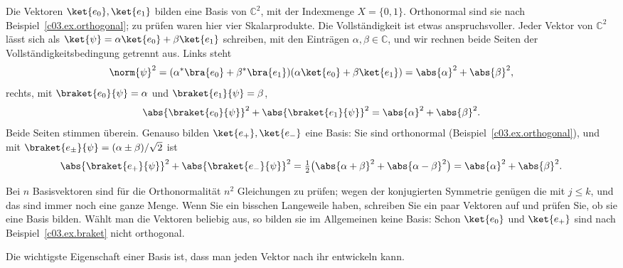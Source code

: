 \begin{example}\label{c03.ex.basis}
  Die Vektoren $\ket{e_0}, \ket{e_1}$ bilden eine Basis von $\mathbb{C}^2$, mit der Indexmenge
  $X = \{0, 1\}$. Orthonormal sind sie nach Beispiel~\ref{c03.ex.orthogonal}; zu prüfen waren
  hier vier Skalarprodukte. Die Vollständigkeit ist etwas anspruchsvoller. Jeder Vektor von
  $\mathbb{C}^2$ lässt sich als $\ket{\psi} = \alpha \ket{e_0} + \beta \ket{e_1}$ schreiben, mit
  den Einträgen $\alpha, \beta \in \mathbb{C}$, und wir rechnen beide Seiten der
  Vollständigkeitsbedingung getrennt aus. Links steht
  \begin{equation}\label{c03.eq.basis-links}
    \norm{\psi}^2 = (\alpha^* \bra{e_0} + \beta^* \bra{e_1}) (\alpha \ket{e_0} + \beta \ket{e_1})
    = \abs{\alpha}^2 + \abs{\beta}^2 ,
  \end{equation}
  rechts, mit $\braket{e_0}{\psi} = \alpha$ und $\braket{e_1}{\psi} = \beta$,
  \begin{equation}\label{c03.eq.basis-rechts}
    \abs{\braket{e_0}{\psi}}^2 + \abs{\braket{e_1}{\psi}}^2 = \abs{\alpha}^2 + \abs{\beta}^2 .
  \end{equation}
  Beide Seiten stimmen überein. Genauso bilden $\ket{e_+}, \ket{e_-}$ eine Basis: Sie sind
  orthonormal (Beispiel~\ref{c03.ex.orthogonal}), und mit
  $\braket{e_\pm}{\psi} = (\alpha \pm \beta) / \sqrt{2}$ ist
  \begin{equation}\label{c03.eq.basis-pm}
    \abs{\braket{e_+}{\psi}}^2 + \abs{\braket{e_-}{\psi}}^2
    = \tfrac12 \bigl( \abs{\alpha + \beta}^2 + \abs{\alpha - \beta}^2 \bigr)
    = \abs{\alpha}^2 + \abs{\beta}^2 .
  \end{equation}
\end{example}

Bei $n$ Basisvektoren sind für die Orthonormalität $n^2$ Gleichungen zu prüfen; wegen der
konjugierten Symmetrie genügen die mit $j \leq k$, und das sind immer noch eine ganze Menge.
Wenn Sie ein bisschen Langeweile haben, schreiben Sie ein paar Vektoren auf und prüfen Sie, ob
sie eine Basis bilden. Wählt man die Vektoren beliebig aus, so bilden sie im Allgemeinen
keine Basis: Schon $\ket{e_0}$ und $\ket{e_+}$ sind nach Beispiel~\ref{c03.ex.braket} nicht
orthogonal.

Die wichtigste Eigenschaft einer Basis ist, dass man jeden Vektor nach ihr entwickeln kann.

